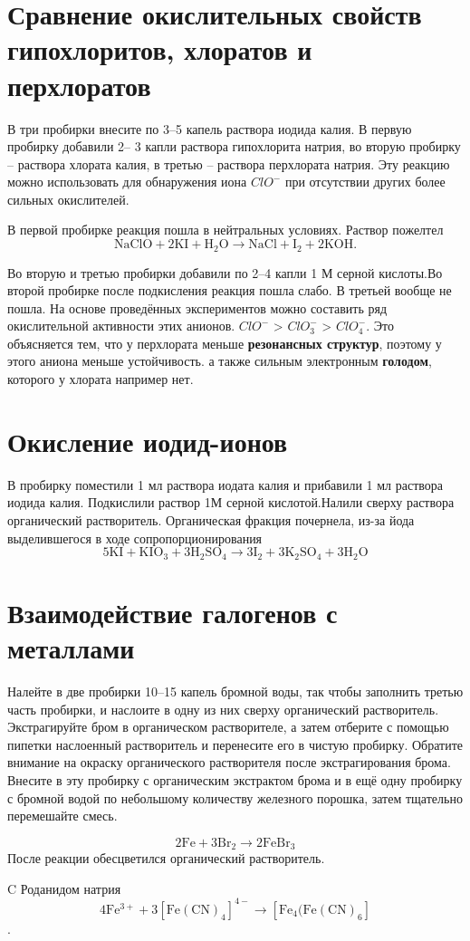 \documentclass[a4paper,12pt]{article}
\begin{document}
\section{Сравнение окислительных свойств гипохлоритов, хлоратов и перхлоратов}
В три пробирки внесите по 3–5 капель раствора иодида калия. В первую пробирку добавили 2–
3 капли раствора гипохлорита натрия, во вторую пробирку – раствора хлората калия, в третью –
раствора перхлората натрия.  Эту реакцию можно использовать для обнаружения иона $ClO^-$ при отсутствии других более
сильных окислителей.


В первой пробирке реакция пошла в нейтральных условиях. Раствор пожелтел
\begin{equation} 
\mathrm{NaClO + 2KI + H_2O \longrightarrow NaCl + I_2 + 2KOH. } 
\end{equation}

 Во вторую и третью пробирки добавили по 2–4 капли 1 М серной кислоты.Во второй пробирке после подкисления реакция пошла слабо. В третьей вообще не пошла. На основе проведённых экспериментов можно составить ряд окислительной активности этих анионов.  $ClO^-$ > $ClO_3^-$ > $ClO_4^-$. Это объясняется тем, что у перхлората меньше \textbf{резонансных структур}, поэтому у этого аниона меньше устойчивость. а также сильным электронным \textbf{голодом}, которого у хлората например нет.
\section{Окисление иодид-ионов}
В пробирку поместили 1 мл раствора иодата калия и прибавили 1 мл раствора иодида калия.
Подкислили раствор 1М серной кислотой.Налили
сверху раствора органический растворитель. Органическая фракция почернела, из-за йода выделившегося в ходе сопропорционирования
\begin{equation} 
\mathrm{5KI + KIO_3 + 3H_2SO_4 \longrightarrow 3I_2 + 3K_2SO_4 + 3H_2O } 
\end{equation}
\section{Взаимодействие галогенов с металлами}
Налейте в две пробирки 10–15 капель бромной воды, так чтобы заполнить третью часть
пробирки, и наслоите в одну из них сверху органический растворитель. Экстрагируйте бром в
органическом растворителе, а затем отберите с помощью пипетки наслоенный растворитель и
перенесите его в чистую пробирку. Обратите внимание на окраску органического растворителя
после экстрагирования брома. Внесите в эту пробирку с органическим экстрактом брома и в ещё
одну пробирку с бромной водой по небольшому количеству железного порошка, затем тщательно
перемешайте смесь. 

\begin{equation} 
\mathrm{2Fe + 3Br_2 \longrightarrow 2FeBr_3 } 
\end{equation}
После реакции обесцветился органический растворитель.



C Роданидом натрия
\begin{equation} 
\mathrm{4Fe^{3+}+3[Fe(CN)_4]^{4-}  \longrightarrow [Fe_4(Fe(CN)_6] } 
\end{equation}
.
\end{document}
